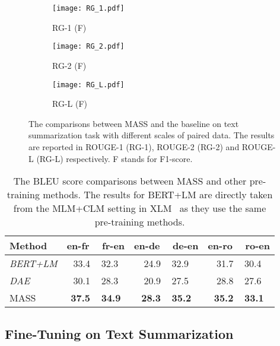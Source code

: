 \documentclass{article}
\begin{document}
	\begin{figure}[h] 
		\centering
		\begin{subfigure}[h]{0.15\textwidth}
			\texttt{[image: RG\_1.pdf]}
			\vspace{-0.5cm}
			\caption{RG-1 (F)}
			\label{sub1}
		\end{subfigure}
		\begin{subfigure}[h]{0.15\textwidth}
			\texttt{[image: RG\_2.pdf]}
			\vspace{-0.5cm}
			\caption{RG-2 (F)}
			\label{sub2}
		\end{subfigure}
		\begin{subfigure}[h]{0.15\textwidth}
			\texttt{[image: RG\_L.pdf]}
			\vspace{-0.5cm}
			\caption{RG-L (F)}
			\label{sub3}
		\end{subfigure}
		\vspace{-0.2cm}
		\caption{The comparisons between MASS and the baseline on text summarization task with different scales of paired data. The results are reported in ROUGE-1 (RG-1), ROUGE-2 (RG-2) and ROUGE-L (RG-L) respectively. F stands for F1-score.}
		\label{text summarization}
	\end{figure}
	
	\begin{table}
		\small
		\centering
		\begin{tabular}{l|c|c|c}
			\toprule
			Method & en-fr ~ fr-en & en-de ~ de-en & en-ro ~ ro-en \\
			\midrule 
			\textit{BERT+LM} & 33.4 ~ 32.3 & 24.9 ~ 32.9 & 31.7 ~ 30.4 \\
			\textit{DAE}     & 30.1 ~ 28.3 & 20.9 ~ 27.5 & 28.8 ~ 27.6 \\
			\midrule
			MASS 	 & \textbf{37.5} ~ \textbf{34.9} & \textbf{28.3} ~ \textbf{35.2} & \textbf{35.2} ~ \textbf{33.1} \\
			\bottomrule
		\end{tabular}
		\vspace{-0.1cm}
		\caption{The BLEU score comparisons between MASS and other pre-training methods. The results for BERT+LM are directly taken from the MLM+CLM setting in XLM~\citep{Lample2019MLM} as they use the same pre-training methods.}
		\label{tab_pretraining_compare}
	\end{table}
	
	\subsection{Fine-Tuning on Text Summarization}
\end{document}
